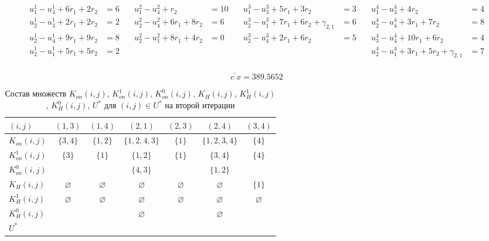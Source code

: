 \documentclass[a4paper,14pt,usenames,dvipsnames]{extreport}
\begin{document}
{\scriptsize
\begin{align*}
u_{1}^{1}-u_{4}^{1}+6 r_{1}+2 r_{2}&=6 \quad & u_{1}^{2}-u_{4}^{2}+ r_{2}&=10 \quad &u_{1}^{3}-u_{3}^{3}+5 r_{1}+3 r_{2}&=3 \quad & u_{1}^{4}-u_{3}^{4}+4 r_{2}&=4\\
u_{2}^{1}-u_{3}^{1}+2 r_{1}+2 r_{2}&=2 \quad  & u_{2}^{2}-u_{4}^{2}+6 r_{1}+8 r_{2}&=6 \quad  &u_{2}^{3}-u_{1}^{3}+7 r_{1}+6 r_{2}+\gamma_{2,1}&=6 \quad & u_{2}^{4}-u_{4}^{4}+3 r_{1}+7 r_{2}&=8\\
u_{2}^{1}-u_{4}^{1}+9 r_{1}+9 r_{2}&=8 \quad & u_{2}^{2}-u_{1}^{2}+8 r_{1}+4 r_{2} & =0 \quad  & u_{2}^{3}-u_{4}^{3}+2 r_{1}+6 r_{2}&=5 \quad & u_{3}^{4}-u_{4}^{4}+10 r_{1}+6 r_{2}&=4\\
u_{2}^{1}-u_{1}^{1} + 5 r_{1} + 5 r_{2}&=2 \quad && \quad && \quad &u_{2}^{4}-u_{1}^{4} + 3 r_{1} + 5 r_{2} + \gamma_{2,1} &= 7 \\
\end{align*}
}%

$$
c^{\prime} x=389.5652
$$

\begin{table}[H] 
\renewcommand{\arraystretch}{1.3}
\caption{Состав множеств $K_{on}(i, j)$, $K_{on}^{1}(i, j)$, $K_{on}^{0}(i, j)$, $K_{H}(i, j)$, $K_{H}^{1}(i, j)$, $K_{H}^{0}(i, j)$, $U^{*}$ для $(i, j) \in U^{*}$ на второй итерации} \label{tab:t11}
\begin{center}
\begin{tabular}{|l|c|c|c|c|c|c|}
\hline$(i, j)$ & $(1,3)$ & $(1,4)$ & $(2,1)$ & $(2,3)$ & $(2,4)$ & $(3,4)$\\
\hline$K_{o n}(i, j)$ & $\{3,4\}$  & $\{1,2\}$ & $\{1,2,4,3\}$ & $\{1\}$& $\{1,2,3,4\}$ & $\{4\}$\\
\hline$K_{o n}^{1}(i, j)$ & $\{3\}$  & $\{1\}$ & $\{1,2\}$ & $\{1\}$ & $\{3,4\}$ & $\{4\}$\\
\hline$K_{o n}^{0}(i, j)$ & & & $\{4,3\}$ & & $\{1,2\}$ & \\
\hline$K_{H}(i, j)$ & $\varnothing$ & $\varnothing$ & $\varnothing$ & $\varnothing$ & $\varnothing$ & $\{1\}$\\
\hline$K_{H}^{1}(i, j)$ & $\varnothing$ & $\varnothing$ & $\varnothing$ & $\varnothing$ & $\varnothing$ & $\varnothing$\\
\hline$K_{H}^{0}(i, j)$ & & & $\varnothing$ & & $\varnothing$ & \\
\hline$U^{*}$ & & & & & &\\
\hline
\end{tabular}
\end{center}
\end{table}
\end{document}
